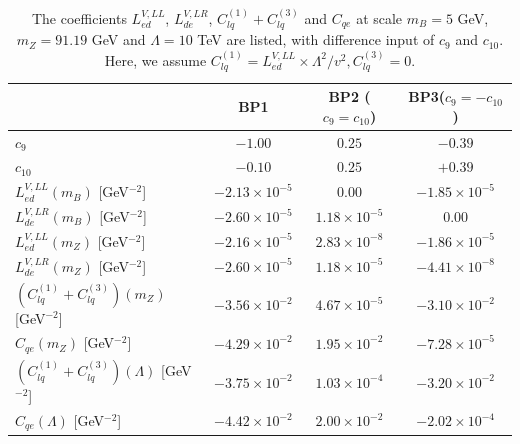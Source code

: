 \documentclass[a4paper,11pt]{article}
\begin{document}
\begin{center}
\begin{table}
  \begin{center}
  \begin{tabular}{|l|c|c|c|}
  \hline
  & BP1 & BP2 ($c_9=c_{10}$)& BP3($c_9=-c_{10}$) \\
  \hline
$c_9$  &      $-1.00$        &     $0.25$         &       $-0.39$         \\
$c_{10}$  &      $-0.10$     &     $0.25$       &       $+0.39$       \\
  \hline  
  $L^{V,LL}_{ed}(m_B)$ [GeV$^{-2}$]                   &   $-2.13\times 10^{-5}$   &  $0.00$                &  $-1.85\times 10^{-5}$    \\
  $L^{V,LR}_{de}(m_B)$ [GeV$^{-2}$]                   &   $-2.60\times 10^{-5}$   &  $1.18\times 10^{-5}$  &  $0.00$                   \\ 
\hline
  $L^{V,LL}_{ed}(m_Z)$ [GeV$^{-2}$]                   &   $-2.16\times 10^{-5}$   &  $2.83\times 10^{-8}$  &  $-1.86\times 10^{-5}$       \\
  $L^{V,LR}_{de}(m_Z)$ [GeV$^{-2}$]                   &   $-2.60\times 10^{-5}$   &  $1.18\times 10^{-5}$  &  $-4.41\times 10^{-8}$    
\\
  \hline
  $(C^{(1)}_{lq}+C^{(3)}_{lq})(m_Z)$ [GeV$^{-2}$]     &   $-3.56\times 10^{-2}$   &  $4.67\times 10^{-5}$  &  $-3.10\times 10^{-2}$    \\
  $C_{qe}(m_Z)$ [GeV$^{-2}$]                          &   $-4.29\times 10^{-2}$   &  $1.95\times 10^{-2}$  &  $-7.28\times 10^{-5}$    \\
  \hline
  $(C^{(1)}_{lq}+C^{(3)}_{lq})(\Lambda)$ [GeV$^{-2}$] &   $-3.75\times 10^{-2}$   &  $1.03\times 10^{-4}$  &  $-3.20\times 10^{-2}$    \\                    
  $C_{qe}(\Lambda)$ [GeV$^{-2}$]                      &   $-4.42\times 10^{-2}$   &  $2.00\times 10^{-2}$  &  $-2.02\times 10^{-4}$   \\
  \hline
  \end{tabular}
  \end{center}
  \caption{The coefficients $L^{V,LL}_{ed}$, $L^{V,LR}_{de}$, $C^{(1)}_{lq}+C^{(3)}_{lq}$ and $C_{qe}$ at scale $m_B=5$ GeV, $m_Z=91.19$ GeV and $\Lambda=10$ TeV are listed, with difference input of $c_9$ and $c_{10}$. Here, we assume $C^{(1)}_{lq}=L^{V,LL}_{ed}\times \Lambda^2/v^2, C^{(3)}_{lq}=0$. \label{table:LVLLed}}
\end{table}
\end{center}
\end{document}
